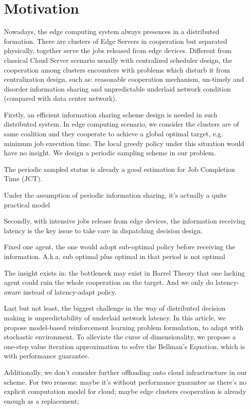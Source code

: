\section{Motivation}
Nowadays, the edge computing system always presences in a distributed formation.
There are clusters of Edge Servers in cooperation but separated physically, together serve the jobs released from edge devices.
Different from classical Cloud Server scenario usually with centralized scheduler design, the cooperation among clusters encounters with problems which disturb it from centralization design, such as: reasonable cooperation mechanism, un-timely and disorder information sharing and unpredictable underlaid network condition (compared with data center network).

Firstly, an efficient information sharing scheme design is needed in such distributed system.
In edge computing scenario, we consider the clusters are of same coalition and they cooperate to achieve a global optimal target, e.g. minimum job execution time.
The local greedy policy under this situation would have no insight.
We design a periodic sampling scheme in our problem.
\begin{example}
    The periodic sampled status is already a good estimation for Job Completion Time (JCT).
\end{example}
Under the assumption of periodic information sharing, it's actually a quite practical model 

Secondly, with intensive jobs release from edge devices, the information receiving latency is the key issue to take care in dispatching decision design.
\begin{example}
    Fixed one agent, the one would adopt sub-optimal policy before receiving the information. A.k.a, sub optimal plus optimal in that period is not optimal
\end{example}
The insight exists in: the bottleneck may exist in Barrel Theory that one lacking agent could ruin the whole cooperation on the target.
And we only do latency-aware instead of latency-adapt policy.

Last but not least, the biggest challenge in the way of distributed decision making is unpredictability of underlaid network latency.
In this article, we propose model-based reinforcement learning problem formulation, to adapt with stochastic environment.
To alleviate the curse of dimensionality, we propose a one-step value iteration approximation to solve the Bellman's Equation, which is with performance guarantee.

Additionally, we don't consider further offloading onto cloud infrastructure in our scheme.
For two reasons: maybe it's without performance guarantee as there's no explicit computation model for cloud; maybe edge clusters cooperation is already enough as a replacement; 
